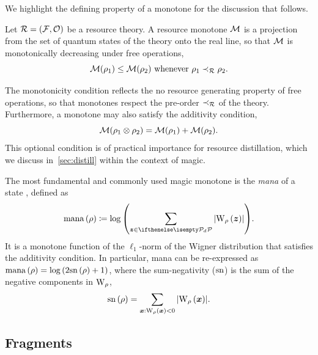 \documentclass[pra,
aps,
twocolumn,
superscriptaddress,
groupedaddress,
nofootinbib,
reprint
]{revtex4-1}
\begin{document}
We highlight the defining property of a monotone for the discussion that follows.
\begin{definition}\label{def:mono}
    Let $\mathcal{R} = (\mathcal{F}, \mathcal{O})$ be a resource theory.
    A resource monotone $\mathcal{M}$ is a projection from the set of quantum states of the theory onto the real line, so that $\mathcal{M}$ is monotonically decreasing under free operations,
    \begin{equation}
        \mathcal{M}(\rho_1) \leq \mathcal{M}(\rho_2)\ \text{whenever}\ \rho_1 \prec_{\mathcal{R}} \rho_2.
    \end{equation}
\end{definition}
The monotonicity condition reflects the no resource generating property of free operations, so that monotones respect the pre-order $\prec_{\mathcal{R}}$ of the theory.
Furthermore, a monotone may also satisfy the additivity condition,
\begin{equation}
    \mathcal{M}(\rho_1 \otimes \rho_2) = \mathcal{M}(\rho_1) + \mathcal{M}(\rho_2).
\end{equation}
This optional condition is of practical importance for resource distillation, which we discuss in~\cref{sec:distill} within the context of magic.

The most fundamental and commonly used magic monotone is the \emph{mana} of a state , defined as
\begin{equation}
    \mana{\rho} \coloneqq \log{\left(\sum\limits_{\bmz \in \pd} \abs{\W[\bmz]{\rho}}\right)}.
\end{equation}
It is a monotone function of the $\ell_1$-norm of the Wigner distribution that satisfies the additivity condition.
In particular, mana can be re-expressed as ${{\rm{mana}}\left(\rho\right)} = \log{(2 {{\rm{sn}}\left(\rho\right)} +1)}$, where the sum-negativity ($\rm{sn}$)  is the sum of the negative components in $\W{\rho}$,
\begin{equation}
	\sn{\rho} = \sum\limits_{\bmx: \W[\bmx]{\rho} < 0} \abs{\W[\bmx]{\rho}}.
\end{equation}

\subsection{Fragments}
\end{document}
